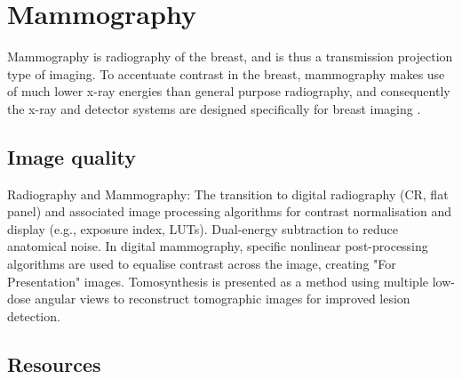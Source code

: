 \chapter{Mammography}

Mammography is radiography of the breast, and is thus a transmission
projection type of imaging. To accentuate contrast in the breast,
mammography makes use of much lower x-ray energies than general
purpose radiography, and consequently the x-ray and detector systems
are designed specifically for breast imaging
\cite{bushberg2011essential}.

\section{Image quality}

Radiography and Mammography: The transition to digital radiography
(CR, flat panel) and associated image processing algorithms for
contrast normalisation and display (e.g., exposure index,
LUTs). Dual-energy subtraction to reduce anatomical noise. In digital
mammography, specific nonlinear post-processing algorithms are used to
equalise contrast across the image, creating "For Presentation"
images. Tomosynthesis is presented as a method using multiple low-dose
angular views to reconstruct tomographic images for improved lesion
detection.

\section{Resources}


